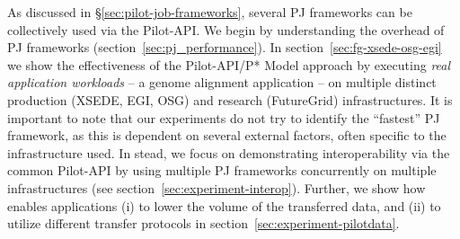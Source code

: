 \documentclass[conference]{IEEEtran}
\begin{document}

As discussed in \S\ref{sec:pilot-job-frameworks}, several PJ
frameworks can be collectively used via the Pilot-API. We begin by
understanding the overhead of PJ frameworks
(section~\ref{sec:pj_performance}). In
section~\ref{sec:fg-xsede-osg-egi} we show the effectiveness of the
Pilot-API/P* Model approach by executing {\it real application
  workloads} -- a genome alignment application -- on multiple distinct
production (XSEDE, EGI, OSG) and research (FutureGrid)
infrastructures. It is important to note that our experiments do not
try to identify the ``fastest'' PJ framework, as this is dependent on
several external factors, often specific to the infrastructure
used. In stead, we focus on demonstrating interoperability via the
common Pilot-API by using multiple PJ frameworks concurrently on
multiple infrastructures (see section~\ref{sec:experiment-interop}).
Further, we show how \pilotdata enables applications (i) to lower
the volume of the transferred data, and (ii) to utilize different
transfer protocols in section~\ref{sec:experiment-pilotdata}.





\end{document}
